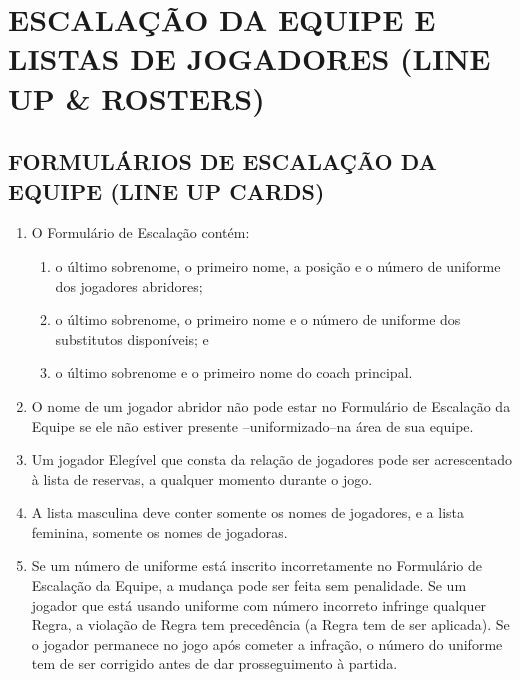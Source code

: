 \section{ESCALA\c{C}ÃO DA EQUIPE E LISTAS DE JOGADORES (LINE UP \& ROSTERS)}
\begin{multicols}{2} 
	\subsection{FORMUL\'ARIOS DE ESCALA\c{C}ÃO DA EQUIPE (LINE UP CARDS)}
	
	\begin{enumerate}[label=\alph*)]
		\item O Formul\'ario de Escala\c{c}\~ao cont\'em: 
		\begin{enumerate}[label=\roman* -]
			\item  o \'ultimo sobrenome, o primeiro nome, a posi\c{c}\~ao e o n\'umero de uniforme dos jogadores abridores; 
			\item  o \'ultimo sobrenome, o primeiro nome e o n\'umero de uniforme dos substitutos dispon\'iveis; e 
			\item o \'ultimo sobrenome e o primeiro nome do \gls{coach} principal. 
		\end{enumerate}
		
		\item  O nome de um jogador abridor n\~ao pode estar no Formul\'ario de Escala\c{c}\~ao da Equipe se ele n\~ao estiver presente –uniformizado–na \'area de sua equipe. 
		
		\item  Um jogador Eleg\'ivel que consta da rela\c{c}\~ao de jogadores pode ser acrescentado \`a lista de reservas, a qualquer momento durante o jogo. 
		
		\item  A lista masculina deve conter somente os nomes de jogadores, e a lista feminina, somente os nomes de jogadoras. 
		
		\item  Se um n\'umero de uniforme est\'a inscrito incorretamente no Formul\'ario de Escala\c{c}\~ao da Equipe, a mudan\c{c}a pode ser feita sem penalidade. Se um jogador que est\'a usando uniforme com n\'umero incorreto infringe qualquer Regra, a viola\c{c}\~ao de Regra tem preced\^encia (a Regra tem de ser aplicada). Se o jogador permanece no jogo ap\'os cometer a infra\c{c}\~ao, o n\'umero do uniforme tem de ser corrigido antes de dar prosseguimento \`a partida. 
	\end{enumerate}
	

\end{multicols}
